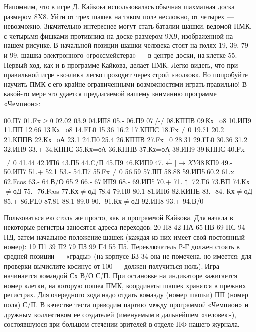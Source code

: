 \documentclass[11pt,a4paper,oneside]{article}
\def\XY{$\stackrel[\leftarrow]{\rightarrow}{XY}$}
\begin{document}
Напомним, что в игре Д. Кайкова использовалась обычная шахматная доска размером 8X8. Уйти от трех шашек на таком поле несложно, от четырех — невозможно. Значительно интереснее могут стать баталии шашки, ведомой ПМК, с четырьмя фишками противника на доске размером 9X9, изображенной на нашем рисунке. В начальной позиции шашки человека стоят на полях 19, 39, 79 и 99, шашка электронного «гроссмейстера» — в центре доски, на клетке 55. Первый ход, как и в программе Кайкова, делает ПМК. Легко видеть, что при правильной игре «козлик» легко проходит через строй «волков». Но попробуйте научить ПМК с его крайне ограниченными возможностями играть правильно! В какой-то мере это удается предлагаемой вашему вниманию программе «Чемпион»: 

00.П7 01.Fx$\geq$0 02.02 03.9 04.ИП8 05.- 06.П9 07./-/ 08.КППВ 09.Кх=о8 10.ИП9 11.ПП 12.66 13.Кх=о8 14.FL0 15.36
16.2 17.КППС 18.Fx$\neq$0 19.31 20.2 21.КППВ 22.Кх=оА 23.1 24.П0 25.4
26.КППВ 27.Fx=0 28.31 29.FL0 30.36
31.2 32.ИП9 33.+ 34.КППС 35.Кх=оА 36.КППВ 37.Кх=оА 38.ИП9 39.КППС
40.Fx$\neq$0 41.44 42.ИП6 43.П5 44.C/П
45.П9 46.КИП9 47.\XY 48.КП9 49.- 50.ИП7 51.+ 52.1 53.- 54.П7 55.Fx$\neq$0 56.59 57.ПП 58.88 59.ИП5 60.2 61.x 62.Fcos 63.- 64.В/О 65.2 66.- 67.ИП9 68.- 69.ИП5 70.+ 71.$\uparrow$ 72.П6 73.ВП 74.Кх$\neq$оД 75.- 76.Fcos 77.Кх$\neq$оД 78.4 79.П0 80.1 81.ИП6 82.КИПЕ 83.-
84. Кх$\neq$оД 85.+ 86.FL0 87.81 88.1 89.0 90.- 91.Кх$\neq$оД 92.ИП8 93.+ 94.В/0

Пользоваться ею столь же просто, как и программой Кайкова. Для начала в некоторые регистры заносятся адреса переходов: 20 П8 42 ПА 65 ПВ 69 ПС 94 ПД, затем начальное положение шашек (каждая из них имеет свой постоянный номер): 19 П1 39 П2 79 ПЗ 99 П4 55 П5. Переключатель Р-Г должен стоять в средней позиции — «грады» (на корпусе БЗ-34 она не помечена, но имеется; для проверки вычислите косинус от 100 — должен получиться ноль). Игра начинается командой Сх В/О С/П. При остановке на индикаторе зажигается номер клетки, на которую пошел ПМК, координаты шашек хранятся в прежних регистрах. Для очередного хода надо отдать команду (номер шашки) ПП (номер поля) С/П. В качестве теста приводим партию между программой «Чемпион» и дружным коллективом ее создателей (именуемым в дальнейшем «человек»), состоявшуюся при большом стечении зрителей в отделе НФ нашего журнала.
\end{document}
